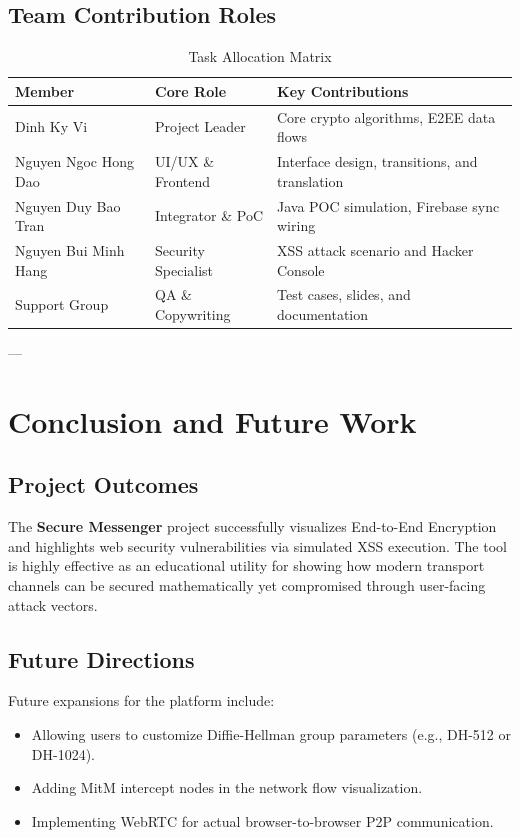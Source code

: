 \documentclass[12pt,a4paper]{article}
\begin{document}
\subsection{Team Contribution Roles}
\begin{table}[h]
\centering
\caption{Task Allocation Matrix}
\begin{tabular}{llp{6.5cm}}
\toprule
\textbf{Member} & \textbf{Core Role} & \textbf{Key Contributions} \\
\midrule
Dinh Ky Vi & Project Leader & Core crypto algorithms, E2EE data flows \\
Nguyen Ngoc Hong Dao & UI/UX \& Frontend & Interface design, transitions, and translation \\
Nguyen Duy Bao Tran & Integrator \& PoC & Java POC simulation, Firebase sync wiring \\
Nguyen Bui Minh Hang & Security Specialist & XSS attack scenario and Hacker Console \\
Support Group & QA \& Copywriting & Test cases, slides, and documentation \\
\bottomrule
\end{tabular}
\end{table}

---

\section{Conclusion and Future Work}
\subsection{Project Outcomes}
The \textbf{Secure Messenger} project successfully visualizes End-to-End Encryption and highlights web security vulnerabilities via simulated XSS execution. The tool is highly effective as an educational utility for showing how modern transport channels can be secured mathematically yet compromised through user-facing attack vectors.

\subsection{Future Directions}
Future expansions for the platform include:
\begin{itemize}
    \item Allowing users to customize Diffie-Hellman group parameters (e.g., DH-512 or DH-1024).
    \item Adding MitM intercept nodes in the network flow visualization.
    \item Implementing WebRTC for actual browser-to-browser P2P communication.
\end{itemize}
\end{document}
